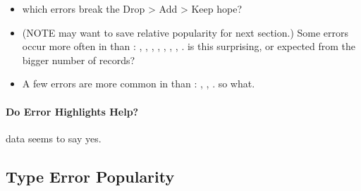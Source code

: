 \documentclass[english,submission,cleveref]{programming}
\begin{document}
\begin{itemize}
  \item
    \FILL{} which errors break the Drop > Add > Keep hope?

  \item
    (NOTE may want to save relative popularity for next section.)
    Some errors occur more often in \mnonstrict{} than \mstrict{}:
    ,
    ,
    ,
    ,
    ,
    ,
    ,
    .
    \FILL{} is this surprising, or expected from the bigger number of
    \mnonstrict{} records?

  \item
    A few errors are more common in \mstrict{} than \mnonstrict{}:
    ,
    ,
    .
    \FILL{} so what.

\end{itemize}


\paragraph{Do Error Highlights Help?}

\FILL{} data seems to say yes.


\subsection{Type Error Popularity}
\label{s:type-error-count}
\end{document}
